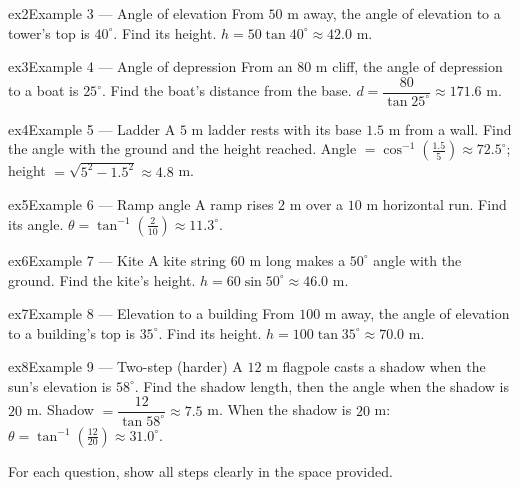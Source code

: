 \documentclass[11pt]{article}
\begin{document}
\begin{example}{ex2}{Example 3 --- Angle of elevation}
From $50$ m away, the angle of elevation to a tower's top is $40^\circ$. Find its height.
\soln $h=50\tan40^\circ\approx42.0$ m.
\end{example}

\begin{example}{ex3}{Example 4 --- Angle of depression}
From an $80$ m cliff, the angle of depression to a boat is $25^\circ$. Find the boat's distance from the base.
\soln $d=\dfrac{80}{\tan25^\circ}\approx171.6$ m.
\end{example}

\begin{example}{ex4}{Example 5 --- Ladder}
A $5$ m ladder rests with its base $1.5$ m from a wall. Find the angle with the ground and the height reached.
\soln Angle $=\cos^{-1}\!\left(\tfrac{1.5}{5}\right)\approx72.5^\circ$; height $=\sqrt{5^2-1.5^2}\approx4.8$ m.
\end{example}

\begin{example}{ex5}{Example 6 --- Ramp angle}
A ramp rises $2$ m over a $10$ m horizontal run. Find its angle.
\soln $\theta=\tan^{-1}\!\left(\tfrac{2}{10}\right)\approx11.3^\circ.$
\end{example}

\begin{example}{ex6}{Example 7 --- Kite}
A kite string $60$ m long makes a $50^\circ$ angle with the ground. Find the kite's height.
\soln $h=60\sin50^\circ\approx46.0$ m.
\end{example}

\begin{example}{ex7}{Example 8 --- Elevation to a building}
From $100$ m away, the angle of elevation to a building's top is $35^\circ$. Find its height.
\soln $h=100\tan35^\circ\approx70.0$ m.
\end{example}

\begin{example}{ex8}{Example 9 --- Two-step (harder)}
A $12$ m flagpole casts a shadow when the sun's elevation is $58^\circ$. Find the shadow length, then the angle when the shadow is $20$ m.
\soln Shadow $=\dfrac{12}{\tan58^\circ}\approx7.5$ m. When the shadow is $20$ m: $\theta=\tan^{-1}\!\left(\tfrac{12}{20}\right)\approx31.0^\circ.$
\end{example}

\clearpage
{}
For each question, show all steps clearly in the space provided.
\end{document}
